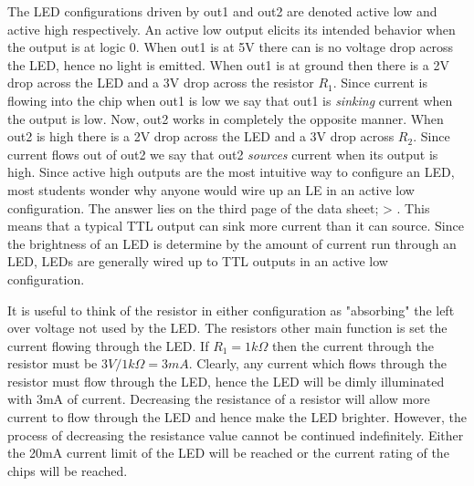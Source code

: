             The LED configurations driven by out1 and out2 are denoted active
            low and active high respectively.  An active low
                    output elicits its intended behavior when the output is at logic 0.
                    When out1 is at 5V there can is no voltage drop across the LED,
                    hence no light is emitted.  When out1 is at ground then there is
                    a 2V drop across the LED and a 3V drop across the resistor $R_1$.
                    Since current is
                    flowing into the chip when out1 is low we say that out1 is
                    \textit{ sinking} current when the output is low.  Now, out2 works in
                    completely the opposite manner.  When out2 is high there is a
                    2V drop across the LED and a 3V drop across $R_2$.  Since current
                    flows out of out2 we say that out2 \textit{ sources} current when its
                    output is high.  Since active high outputs are the most intuitive
                    way to configure an LED, most students wonder why anyone would
                    wire up an LE in an active low configuration.  The answer lies on
                    the third page of the data sheet; \IOL > \IOH.  This means
                    that a typical TTL output can sink more current than it can source.
                    Since the brightness of an LED is determine by the amount of current
                    run through an LED, LEDs are generally wired up to TTL outputs
                    in an active low configuration.

                    It is useful to think of the resistor in either configuration as
                    "absorbing" the left over voltage not used by the LED.  The resistors
                    other main function is set the current
                    flowing through the LED.  If $R_1 = 1k \Omega$ then the current
                    through the resistor must be $3V/1k \Omega = 3mA$.  Clearly, any
                    current which flows through the resistor must flow through the
                    LED, hence the LED will be dimly illuminated with 3mA of current.
                    Decreasing the resistance of a
                    resistor will allow more current to flow through the LED and hence
                    make the LED brighter.  However, the process of decreasing the
                    resistance value cannot be continued indefinitely.  Either the 20mA
                    current limit of the LED will be reached or the current rating of
                    the chips will be reached.

